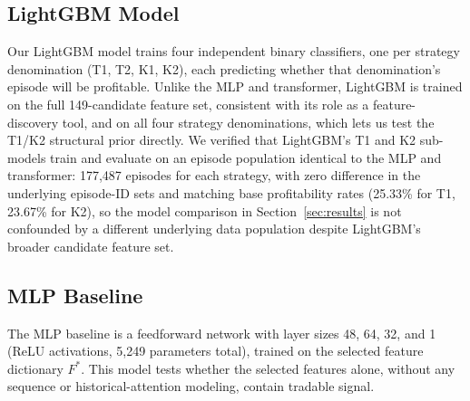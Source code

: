 \documentclass[sigconf,review,anonymous]{acmart}
\begin{document}
\subsection{LightGBM Model}
\label{sec:lgbm-scope}
Our LightGBM model trains four independent binary classifiers, one per strategy denomination (T1, T2, K1, K2), each predicting whether that denomination's episode will be profitable. Unlike the MLP and transformer, LightGBM is trained on the full 149-candidate feature set, consistent with its role as a feature-discovery tool, and on all four strategy denominations, which lets us test the T1/K2 structural prior directly. We verified that LightGBM's T1 and K2 sub-models train and evaluate on an episode population identical to the MLP and transformer: 177{,}487 episodes for each strategy, with zero difference in the underlying episode-ID sets and matching base profitability rates (25.33\% for T1, 23.67\% for K2), so the model comparison in Section~\ref{sec:results} is not confounded by a different underlying data population despite LightGBM's broader candidate feature set.

\subsection{MLP Baseline}
The MLP baseline is a feedforward network with layer sizes 48, 64, 32, and 1 (ReLU activations, 5{,}249 parameters total), trained on the selected feature dictionary $F^{\ast}$. This model tests whether the selected features alone, without any sequence or historical-attention modeling, contain tradable signal.
\end{document}
